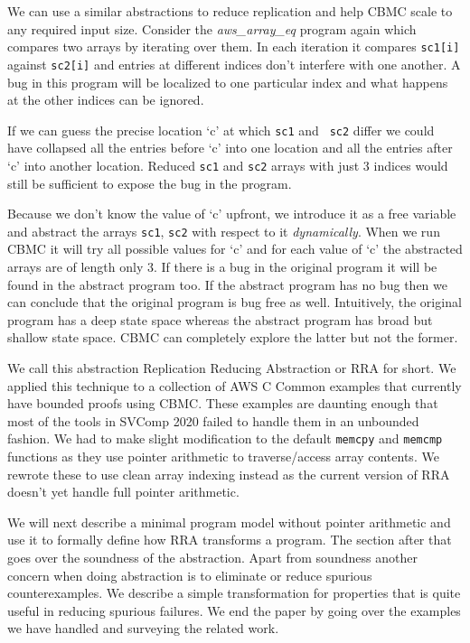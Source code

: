 We can use a similar abstractions to reduce replication and help CBMC
scale to any required input size. Consider the \emph{aws\_array\_eq}
program again which compares two arrays by iterating over them. In
each iteration it compares {\tt sc1[i]} against {\tt sc2[i]} and
entries at different indices don’t interfere with one another. A bug
in this program will be localized to one particular index and what
happens at the other indices can be ignored.

If we can guess the precise location ‘c’ at which {\tt sc1} and {\tt
  sc2} differ we could have collapsed all the entries before ‘c’ into
one location and all the entries after ‘c’ into another
location. Reduced {\tt sc1} and {\tt sc2} arrays with just 3 indices
would still be sufficient to expose the bug in the program.

Because we don’t know the value of ‘c’ upfront, we introduce it as a
free variable and abstract the arrays {\tt sc1}, {\tt sc2} with
respect to it \emph{dynamically}. When we run CBMC it will try all
possible values for ‘c’ and for each value of ‘c’ the abstracted
arrays are of length only 3. If there is a bug in the original program
it will be found in the abstract program too. If the abstract program
has no bug then we can conclude that the original program is bug free
as well. Intuitively, the original program has a deep state space
whereas the abstract program has broad but shallow state space. CBMC
can completely explore the latter but not the former.

We call this abstraction Replication Reducing Abstraction or RRA for
short. We applied this technique to a collection of AWS C Common
examples that currently have bounded proofs using CBMC. These examples
are daunting enough that most of the tools in SVComp 2020 failed to
handle them in an unbounded fashion. We had to make slight
modification to the default {\tt memcpy} and {\tt memcmp} functions as
they use pointer arithmetic to traverse/access array contents. We
rewrote these to use clean array indexing instead as the current
version of RRA doesn't yet handle full pointer arithmetic.

We will next describe a minimal program model without pointer
arithmetic and use it to formally define how RRA transforms a
program. The section after that goes over the soundness of the
abstraction. Apart from soundness another concern when doing
abstraction is to eliminate or reduce spurious counterexamples. We
describe a simple transformation for properties that is quite
useful in reducing spurious failures. We end the paper by going over
the examples we have handled and surveying the related work.
